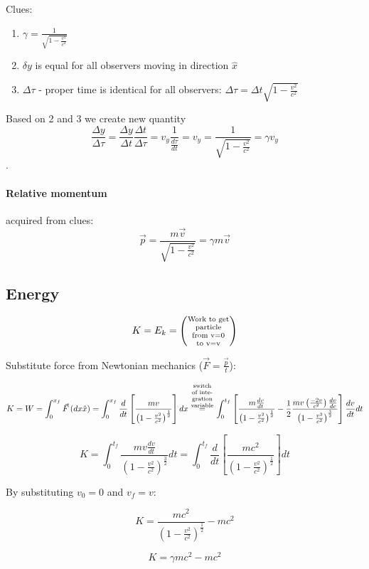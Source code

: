   Clues:
  
  \begin{enumerate}
  	\item $\gamma = \frac{1}{\sqrt{1 - \frac{v^2}{c^2}}}$
  	\item $\delta y$ is equal for all observers moving in direction $\hat{x}$
  	\item $\Delta\tau$ - proper time is identical for all observers: $\Delta \tau = \Delta t \sqrt{1 - \frac{v^2}{c^2}}$
  \end{enumerate}
  
Based on 2 and 3 we create new quantity $$\frac{\Delta y}{\Delta \tau} = \frac{\Delta y}{\Delta t} \frac{\Delta t}{\Delta \tau} = v_y \frac{1}{\frac{d\tau}{dt}} = v_y = \frac{1}{\sqrt{1 - \frac{v^2}{c^2}}} = \gamma v_y $$.
	
	\paragraph{Relative momentum} acquired from clues:
	$$\vec{p} = \frac{m\vec{v}}{\sqrt{1-\frac{v^2}{c^2}}} = \gamma m \vec{v}$$
	
\subsection{Energy}

$$K = E_k = \left(\parbox{1.5cm}{\centering \scriptsize Work to get particle from v=0 to v=v}\right)$$

Substitute force from Newtonian mechanics ($\vec{F} =\frac{\vec{p}}{t}$):

$$K=W= \int_0^{x_f} \vec{F} \left(dx\hat{x}\right) =  \int_0^{x_f} \frac{d}{dt} \left[ \frac{mv}{\left( 1-\frac{v^2}{c^2} \right)^\frac{1}{2}} \right] dx \stackrel{\parbox{1cm}{\centering \scriptsize switch of integration variable}}{=} \int_0^{t_f} \left[ \frac{m \frac{dv}{dt}}{\left( 1-\frac{v^2}{c^2} \right)^\frac{1}{2}} -\frac{1}{2} \frac{mv\left( \frac{-2v}{c^2} \right) \frac{dv}{dc}}{\left( 1-\frac{v^2}{c^2} \right)^\frac{3}{2}} \right]\frac{dv}{dt}dt$$

$$K = \int_{0}^{t_f} \frac{mv\frac{dv}{dt}}{\left( 1-\frac{v^2}{c^2} \right)^\frac{3}{2}}dt = \int_0^{t_f} \frac{d}{dt} \left[ \frac{mc^2}{\left( 1-\frac{v^2}{c^2} \right)^\frac{1}{2}} \right] dt$$

By substituting $v_0=0$ and $v_f=v$:

$$K = \frac{mc^2}{\left( 1-\frac{v^2}{c^2} \right)^\frac{1}{2}} - mc^2$$

$$K = \gamma mc^2 - mc^2$$

